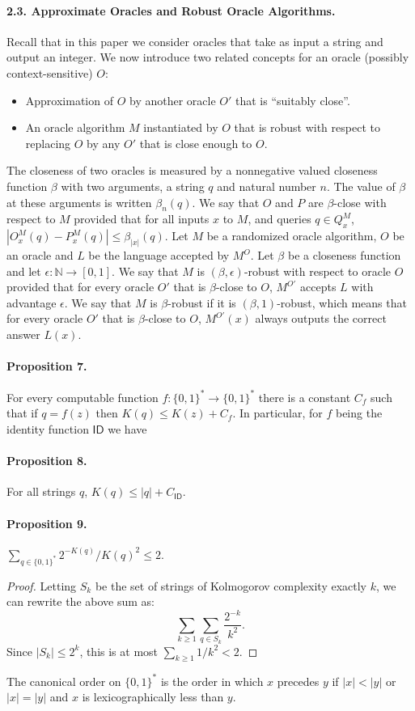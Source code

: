 \documentclass[10pt,a4paper]{article}
\begin{document}
\paragraph{2.3. Approximate Oracles and Robust Oracle Algorithms.}
Recall that in this paper we consider oracles that take as input a string and output an integer. We now introduce two related concepts for an oracle (possibly context-sensitive) $O$:
\begin{itemize}
\item Approximation of $O$ by another oracle $O'$ that is ``suitably close''.
\item An oracle algorithm $M$ instantiated by $O$ that is robust with respect to replacing $O$ by any $O'$ that is close enough to $O$.
\end{itemize}
The closeness of two oracles is measured by a nonnegative valued closeness function $\beta$ with two arguments, a string $q$ and natural number $n$. The value of $\beta$ at these arguments is written $\beta_n(q)$. We say that $O$ and $P$ are $\beta$-close with respect to $M$ provided that for all inputs $x$ to $M$, and queries $q\in Q_x^M$, $|O_x^M(q)-P_x^M(q)|\leq\beta_{|x|}(q)$.
Let $M$ be a randomized oracle algorithm, $O$ be an oracle and $L$ be the language accepted by $M^O$. Let $\beta$ be a closeness function and let $\epsilon:\mathbb N\to[0,1]$. We say that $M$ is $(\beta,\epsilon)$-robust with respect to oracle $O$ provided that for every oracle $O'$ that is $\beta$-close to $O$, $M^{O'}$ accepts $L$ with advantage $\epsilon$. We say that $M$ is $\beta$-robust if it is $(\beta,1)$-robust, which means that for every oracle $O'$ that is $\beta$-close to $O$, $M^{O'}(x)$ always outputs the correct answer $L(x)$.
\paragraph{Proposition 7.}
For every computable function $f:\{0,1\}^*\to\{0,1\}^*$ there is a constant $C_f$ such that if $q=f(z)$ then $K(q)\leq K(z)+C_f$.
In particular, for $f$ being the identity function $\mathsf{ID}$ we have
\paragraph{Proposition 8.}
For all strings $q$, $K(q)\leq|q|+C_{\mathsf{ID}}$.
\paragraph{Proposition 9.}
$\sum_{q\in\{0,1\}^*}2^{-K(q)}/K(q)^2\leq2$.
\begin{proof}
Letting $S_k$ be the set of strings of Kolmogorov complexity exactly $k$, we can rewrite the above sum as:
\[\sum_{k\geq1}\sum_{q\in S_k}\frac{2^{-k}}{k^2}.\]
Since $|S_k|\leq2^k$, this is at most $\sum_{k\geq1}1/k^2<2$.
\end{proof}
The canonical order on $\{0,1\}^*$ is the order in which $x$ precedes $y$ if $|x|<|y|$ or $|x|=|y|$ and $x$ is lexicographically less than $y$.
\end{document}
